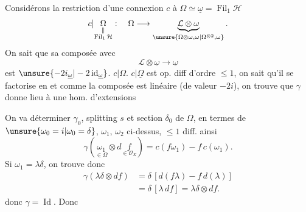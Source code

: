 Considérons la restriction d'une connexion $c$ à $\Omega\simeq\underline{\omega}=\operatorname{Fil}_1\mathcal{H}$
\[
c|\underset{\substack{\Vert\\\operatorname{Fil}_1\mathcal{H}}}{\Omega}:\quad
\Omega\longrightarrow\underbrace{\mathcal{L}\otimes\omega}_{\unsure{\Omega\otimes\omega,\omega|\Omega^{\otimes2},\omega}}.
\]
On sait que sa composée avec
\[
\mathcal{L}\otimes\underline{\omega}\longrightarrow\underline{\omega}
\]
est $\unsure{-2i_{\underline{\omega}}|-2\operatorname{id}_{\underline{\omega}}}$.   $c|\Omega$.
$c|\underline{\Omega}$ est op. diff d'ordre $\leq1$, on sait qu'il se factorise en
et comme la composée
est linéaire (de valeur $-2i$), on trouve que $\gamma$ donne lieu à une hom. d'extensions

On va déterminer $\gamma_0$,  splitting $s$ et section $\delta_0$ de $\Omega$, en termes de $\unsure{\omega_0=i|\omega_0=\delta}$, $\omega_1$, $\omega_2$ ci-dessus,    $\leq1$ diff.
ainsi
\[
\gamma(\underset{\in\Omega}{\omega_1}\otimes d\underset{\in\mathcal{O}_X}{f})=c(f\omega_1)-f\,c(\omega_1).
\]
Si $\omega_1=\lambda\delta$, on trouve donc
\[
\begin{aligned}
\gamma(\lambda\delta\otimes df)&=\delta\,[d(f\lambda)-f\,d(\lambda)]\\
&=\delta\,[\lambda\,df]=\lambda\delta\otimes df.
\end{aligned}
\]
donc $\gamma=\operatorname{Id}$. Donc

